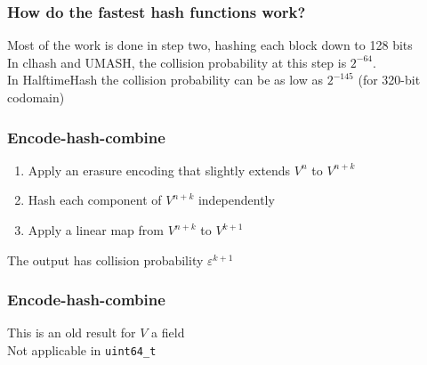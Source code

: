 \documentclass[xcolor=dvipsnames]{beamer}
\begin{document}
\begin{frame}
  \frametitle{How do the fastest hash functions work?}
  Most of the work is done in step two, hashing each block down to 128 bits
  \pause \\ $ $ \\
  In clhash and UMASH, the collision probability at this step is $2^{-64}$.
  \pause \\ $ $ \\
  In HalftimeHash the collision probability can be as low as $2^{-145}$ (for 320-bit codomain)
\end{frame}




\begin{frame}
  \frametitle{Encode-hash-combine}
  \begin{enumerate}
  \item Apply an erasure encoding that slightly extends $V^n$ to $V^{n+k}$
    \pause
  \item Hash each component of $V^{n+k}$ independently
    \pause
  \item Apply a linear map from $V^{n+k}$ to $V^{k+1}$
  \end{enumerate}
  \pause
  The output has collision probability $\varepsilon^{k+1}$
\end{frame}

\begin{frame}[fragile]
  \frametitle{Encode-hash-combine}
  This is an old result for $V$ a field
  \pause
  \\
$ $\\
  Not applicable in \verb|uint64_t|
\end{frame}
\end{document}
